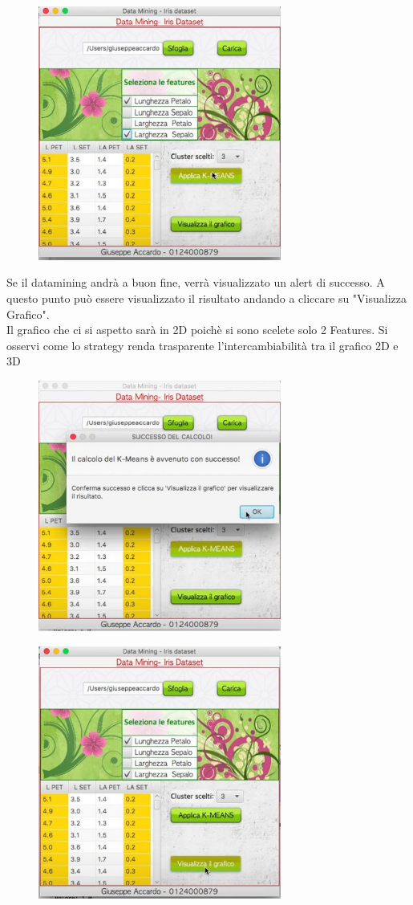 \documentclass[a4paper, oneside]{book}
\begin{document}
\begin{figure}[htp]
\centering
\includegraphics[width=8cm]{7.bmp}
\end{figure}

\newpage

Se il datamining andrà a buon fine, verrà visualizzato un alert di successo. A questo punto può essere visualizzato il risultato andando a cliccare su "Visualizza Grafico". 
\\ Il grafico che ci si aspetto sarà in 2D poichè si sono scelete solo 2 Features. Si osservi come lo strategy renda trasparente l'intercambiabilità tra il grafico 2D e 3D
\begin{figure}[htp]
\centering
\includegraphics[width=8cm]{8.bmp}
\end{figure}

\begin{figure}[htp]
\centering
\includegraphics[width=8cm]{9.bmp}
\end{figure}
\end{document}
